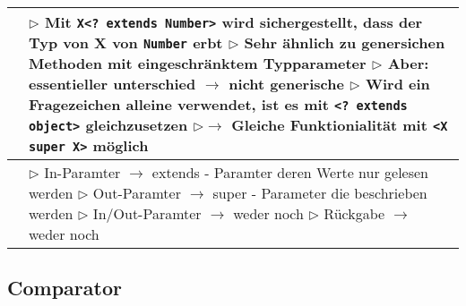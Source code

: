 \begin{table}[H]
\begin{tabular}{ | p{4cm} p{13.5cm} | }
	\makecell[l]{Erklärung} & 
	\makecell[l]
	{
	$\rhd$ Mit \texttt{X<? extends Number>} wird sichergestellt, \\
	\hspace{0.35cm} dass der Typ von X von \texttt{Number} erbt \\
	$\rhd$ Sehr ähnlich zu genersichen Methoden mit eingeschränktem Typparameter \\
	$\rhd$ Aber: essentieller unterschied $\rightarrow$ \textbf{nicht} generische \\
	$\rhd$ Wird ein Fragezeichen alleine verwendet, \\
	\hspace{0.35cm} ist es mit \texttt{<? extends object>} gleichzusetzen \\
	$\rhd\rightarrow$ Gleiche Funktionialität mit \texttt{<X super X>} möglich \\
	} 	\\ \hline


	\makecell[l]{Empfehlung} & 
	\makecell[l]
	{
	$\rhd$ In-Paramter $\rightarrow$ extends \\
	\hspace{0.4cm} - Paramter deren Werte nur gelesen werden \\
	$\rhd$ Out-Paramter $\rightarrow$ super \\
	\hspace{0.4cm} - Parameter die beschrieben werden \\
	$\rhd$ In/Out-Paramter $\rightarrow$ weder noch \\
	$\rhd$ Rückgabe $\rightarrow$ weder noch \\
	} 	\\ \hline


	\end{tabular}
	\end{table}


\subsection{Comparator}


